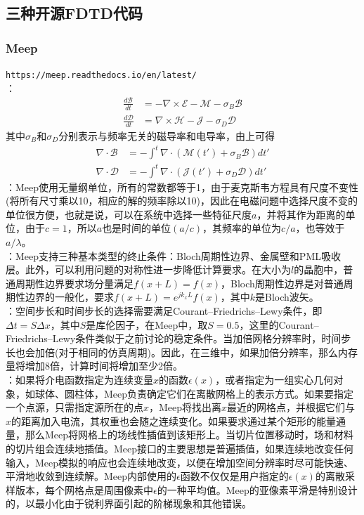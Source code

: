 \documentclass{article}
\numberwithin{equation}{section}
\renewcommand{\vec}[1]{\boldsymbol{#1}}
\begin{document}
\subsection{三种开源FDTD代码}
\subsubsection{Meep}
\texttt{https://meep.readthedocs.io/en/latest/} \\
\textbf{\color{blue}{Meep仿真的麦克斯韦方程}}：
\begin{align}
    \frac{d\vec{\mathcal{B}}}{dt}&=-\nabla\times\vec{\mathcal{E}}-\vec{\mathcal{M}}-\sigma_B\vec{\mathcal{B}} \\
    \frac{d\vec{\mathcal{D}}}{dt}&=\nabla\times\vec{\mathcal{H}}-\vec{\mathcal{J}}-\sigma_D\vec{\mathcal{D}}
\end{align}
其中$\sigma_B$和$\sigma_D$分别表示与频率无关的磁导率和电导率，由上可得
\begin{align}
    \nabla\cdot\vec{\mathcal{B}}&=-\int^t\nabla\cdot\left(\vec{\mathcal{M}}(t')+\sigma_B\vec{\mathcal{B}}\right)dt' \\
    \nabla\cdot\vec{\mathcal{D}}&=-\int^t\nabla\cdot\left(\vec{\mathcal{J}}(t')+\sigma_D\vec{\mathcal{D}}\right)dt'
\end{align}
\textbf{\color{blue}{Meep的单位}}：Meep使用无量纲单位，所有的常数都等于1，由于麦克斯韦方程具有尺度不变性(将所有尺寸乘以10，相应的解的频率除以10)，因此在电磁问题中选择尺度不变的单位很方便，也就是说，可以在系统中选择一些特征尺度$a$，并将其作为距离的单位，由于$c=1$，所以$a$也是时间的单位$(a/c)$，其频率的单位为$c/a$，也等效于$a/\lambda$。\\
\textbf{\color{blue}{Meep的边界条件}}：Meep支持三种基本类型的终止条件：Bloch周期性边界、金属壁和PML吸收层。此外，可以利用问题的对称性进一步降低计算要求。在大小为$l$的晶胞中，普通周期性边界要求场分量满足$f(x+L)=f(x)$，Bloch周期性边界是对普通周期性边界的一般化，要求$f(x+L)=e^{jk_xL}f(x)$，其中$k$是Bloch波矢。\\
\textbf{\color{blue}{Meep的稳定条件}}：空间步长和时间步长的选择需要满足Courant–Friedrichs–Lewy条件，即$\Delta t=S\Delta x$，其中$S$是库伦因子，在Meep中，取$S=0.5$，这里的Courant–Friedrichs–Lewy条件类似于之前讨论的稳定条件。当加倍网格分辨率时，时间步长也会加倍(对于相同的仿真周期)。因此，在三维中，如果加倍分辨率，那么内存量将增加8倍，计算时间将增加至少2倍。\\
\textbf{\color{blue}{Meep的插值过程}}：如果将介电函数指定为连续变量$x$的函数$\epsilon(x)$，或者指定为一组实心几何对象，如球体、圆柱体，Meep负责确定它们在离散网格上的表示方式。如果要指定一个点源，只需指定源所在的点$x$，Meep将找出离$x$最近的网格点，并根据它们与$x$的距离加入电流，其权重也会随之连续变化。如果要求通过某个矩形的能量通量，那么Meep将网格上的场线性插值到该矩形上。当切片位置移动时，场和材料的切片组会连续地插值。Meep接口的主要思想是普遍插值，如果连续地改变任何输入，Meep模拟的响应也会连续地改变，以便在增加空间分辨率时尽可能快速、平滑地收敛到连续解。Meep内部使用的$\epsilon$函数不仅仅是用户指定的$\epsilon(x)$的离散采样版本，每个网格点是周围像素中$\epsilon$的一种平均值。Meep的亚像素平滑是特别设计的，以最小化由于锐利界面引起的阶梯现象和其他错误。\\
\end{document}
